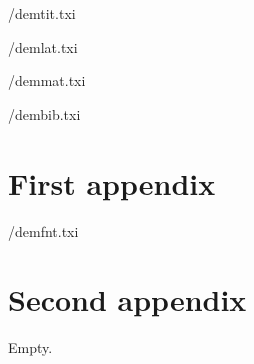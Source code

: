 \documentclass[10pt]{article}
\begin{document}
% 
%
%

 \DEM/demtit.txi
\thispagestyle{empty}
\addtocounter{page}{-1}


\newpage
\tableofcontents


 \DEM/demlat.txi

 \DEM/demmat.txi

 \DEM/dembib.txi

\newpage
\appendix
\section{First appendix}  
 \DEM/demfnt.txi
\newpage
\section{Second appendix} Empty.

\end{document}
